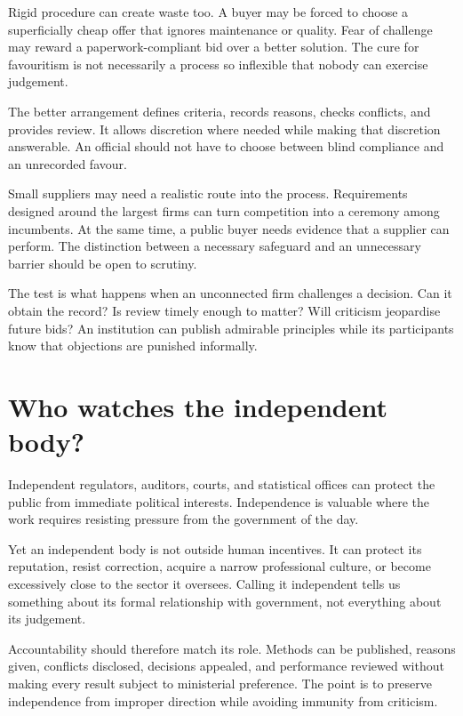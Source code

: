 \documentclass[12pt,a4paper]{book}
\begin{document}
Rigid procedure can create waste too. A buyer may be forced to choose a superficially cheap offer that ignores maintenance or quality. Fear of challenge may reward a paperwork-compliant bid over a better solution. The cure for favouritism is not necessarily a process so inflexible that nobody can exercise judgement.

The better arrangement defines criteria, records reasons, checks conflicts, and provides review. It allows discretion where needed while making that discretion answerable. An official should not have to choose between blind compliance and an unrecorded favour.

Small suppliers may need a realistic route into the process. Requirements designed around the largest firms can turn competition into a ceremony among incumbents. At the same time, a public buyer needs evidence that a supplier can perform. The distinction between a necessary safeguard and an unnecessary barrier should be open to scrutiny.

The test is what happens when an unconnected firm challenges a decision. Can it obtain the record? Is review timely enough to matter? Will criticism jeopardise future bids? An institution can publish admirable principles while its participants know that objections are punished informally.

\section*{Who watches the independent body?}

Independent regulators, auditors, courts, and statistical offices can protect the public from immediate political interests. Independence is valuable where the work requires resisting pressure from the government of the day.

Yet an independent body is not outside human incentives. It can protect its reputation, resist correction, acquire a narrow professional culture, or become excessively close to the sector it oversees. Calling it independent tells us something about its formal relationship with government, not everything about its judgement.

Accountability should therefore match its role. Methods can be published, reasons given, conflicts disclosed, decisions appealed, and performance reviewed without making every result subject to ministerial preference. The point is to preserve independence from improper direction while avoiding immunity from criticism.
\end{document}

